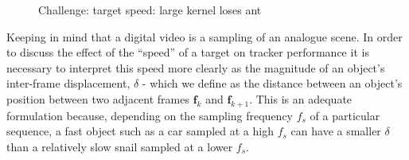 \begin{figure}
    \caption{Challenge: target speed: large kernel loses ant\label{fig_mean_shift_ant_speed2}}
\end{figure}

Keeping in mind that a digital video is a sampling of an analogue scene.
In order to discuss the effect of the ``speed'' of a target on tracker
performance it is necessary to interpret this speed more clearly
as the magnitude of an object's inter-frame displacement, $\delta$ - which
we define as the distance between an object's
position between two adjacent frames $\mathbf{f}_k$ and $\mathbf{f}_{k+1}$.
This is an adequate formulation because, depending on the sampling frequency $f_s$ of
a particular sequence, a fast object such as a car sampled at a high $f_s$ can
have a smaller $\delta$ than a relatively slow snail sampled at a lower $f_s$. 

